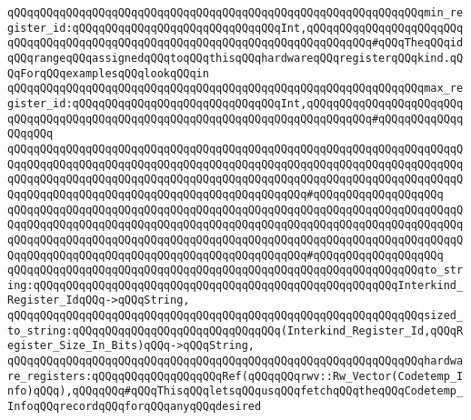 \newline
\verb|qQQqqQQqqQQqqQQqqQQqqQQqqQQqqQQqqQQqqQQqqQQqqQQqqQQqqQQqqQQqqQQqmin_register_id:qQQqqQQqqQQqqQQqqQQqqQQqqQQqqQQqInt,qQQqqQQqqQQqqQQqqQQqqQQqqQQqqQQqqQQqqQQqqQQqqQQqqQQqqQQqqQQqqQQqqQQqqQQqqQQqqQQq#qQQqTheqQQqidqQQqrangeqQQqassignedqQQqtoqQQqthisqQQqhardwareqQQqregisterqQQqkind.qQQqForqQQqexamplesqQQqlookqQQqin|\newline
\verb|qQQqqQQqqQQqqQQqqQQqqQQqqQQqqQQqqQQqqQQqqQQqqQQqqQQqqQQqqQQqqQQqmax_register_id:qQQqqQQqqQQqqQQqqQQqqQQqqQQqqQQqInt,qQQqqQQqqQQqqQQqqQQqqQQqqQQqqQQqqQQqqQQqqQQqqQQqqQQqqQQqqQQqqQQqqQQqqQQqqQQqqQQq#qQQqqQQqqQQqqQQqqQQq|\newline
\verb|qQQqqQQqqQQqqQQqqQQqqQQqqQQqqQQqqQQqqQQqqQQqqQQqqQQqqQQqqQQqqQQqqQQqqQQqqQQqqQQqqQQqqQQqqQQqqQQqqQQqqQQqqQQqqQQqqQQqqQQqqQQqqQQqqQQqqQQqqQQqqQQqqQQqqQQqqQQqqQQqqQQqqQQqqQQqqQQqqQQqqQQqqQQqqQQqqQQqqQQqqQQqqQQqqQQqqQQqqQQqqQQqqQQqqQQqqQQqqQQqqQQqqQQqqQQqqQQq#qQQqqQQqqQQqqQQqqQQq|\newline
\verb|qQQqqQQqqQQqqQQqqQQqqQQqqQQqqQQqqQQqqQQqqQQqqQQqqQQqqQQqqQQqqQQqqQQqqQQqqQQqqQQqqQQqqQQqqQQqqQQqqQQqqQQqqQQqqQQqqQQqqQQqqQQqqQQqqQQqqQQqqQQqqQQqqQQqqQQqqQQqqQQqqQQqqQQqqQQqqQQqqQQqqQQqqQQqqQQqqQQqqQQqqQQqqQQqqQQqqQQqqQQqqQQqqQQqqQQqqQQqqQQqqQQqqQQqqQQqqQQq#qQQqqQQqqQQqqQQqqQQq|\newline
\newline
\verb|qQQqqQQqqQQqqQQqqQQqqQQqqQQqqQQqqQQqqQQqqQQqqQQqqQQqqQQqqQQqqQQqto_string:qQQqqQQqqQQqqQQqqQQqqQQqqQQqqQQqqQQqqQQqqQQqqQQqqQQqqQQqInterkind_Register_IdqQQq->qQQqString,|\newline
\verb|qQQqqQQqqQQqqQQqqQQqqQQqqQQqqQQqqQQqqQQqqQQqqQQqqQQqqQQqqQQqqQQqsized_to_string:qQQqqQQqqQQqqQQqqQQqqQQqqQQqqQQq(Interkind_Register_Id,qQQqRegister_Size_In_Bits)qQQq->qQQqString,|\newline
\newline
\verb|qQQqqQQqqQQqqQQqqQQqqQQqqQQqqQQqqQQqqQQqqQQqqQQqqQQqqQQqqQQqqQQqhardware_registers:qQQqqQQqqQQqqQQqqQQqRef(qQQqqQQqrwv::Rw_Vector(Codetemp_Info)qQQq),qQQqqQQq#qQQqThisqQQqletsqQQqusqQQqfetchqQQqtheqQQqCodetemp_InfoqQQqrecordqQQqforqQQqanyqQQqdesired|\newline
